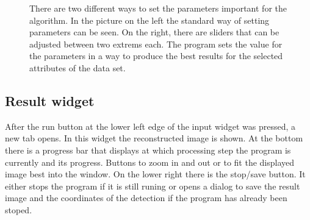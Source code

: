 \begin{figure}
\hfill
{}
	\caption{There are two different ways to set the parameters important for the algorithm. In the picture on the left the standard way of setting parameters can be seen. On the right, there are sliders that can be adjusted between two extrems each. The program sets the value for the parameters in a way to produce the best results for the selected attributes of the data set.}
	\label{guiSettings}	
\end{figure}
\subsection{Result widget}
After the run button at the lower left edge of the input widget was pressed, a new tab opens. In this widget the reconstructed image is shown. At the bottom there is a progress bar that displays at which processing step the program is currently and its progress. Buttons to zoom in and out or to fit the displayed image best into the window. On the lower right there is the stop/save button. It either stops the program if it is still runing or opens a dialog to save the result image and the coordinates of the detection if the program has already been stoped.

